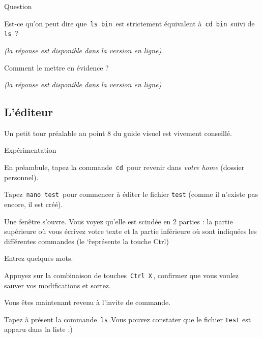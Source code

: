 \documentclass[a4paper,11pt]{article}
\begin{document}
\begin{Exercice}{Question} 

Est-ce qu'on peut dire que \,\verb|ls bin|\, est strictement \'equivalent \`a \,\verb|cd bin|\, suivi de \,\verb|ls|\, ?
				
\par
  {\footnotesize\emph{(la r\'eponse est disponible dans la version en ligne)}\par} Comment le mettre en \'evidence ?
 \par
 {\footnotesize\emph{(la r\'eponse est disponible dans la version en ligne)}\par} 										
			
 \end{Exercice}       
			


\subsection{L'éditeur}

Un petit tour pr\'ealable au point 8 du guide visuel est vivement conseill\'e.
				
\par
        
 \begin{Tutoriel}{Exp\'erimentation}     
\begin{steps}
\item En pr\'eambule, tapez la commande \,\verb|cd|\, pour revenir dans \textit{votre home} (dossier personnel).
\item Tapez \,\verb|nano test|\, pour commencer \`a \'editer le fichier \verb_test_ (comme il n'existe pas encore, il est cr\'e\'e).
\item Une fen\^etre s'ouvre. Vous voyez qu'elle est scind\'ee en 2 parties : la partie sup\'erieure o\`u vous \'ecrivez votre texte et la partie inf\'erieure o\`u sont indiqu\'ees les diff\'erentes commandes (le \char`\^ repr\'esente la touche Ctrl)
\item Entrez quelques mots.
\item Appuyez sur la combinaison de touches \,\verb|Ctrl X|\,, confirmez que vous voulez sauver vos modifications et sortez.
\item Vous \^etes maintenant revenu \`a l'invite de commande.
\item Tapez \`a pr\'esent la commande \,\verb|ls|\,.Vous pouvez constater que le fichier \verb_test_ est apparu dans la liste ;)
\end{steps}
\end{Tutoriel}
\end{document}
